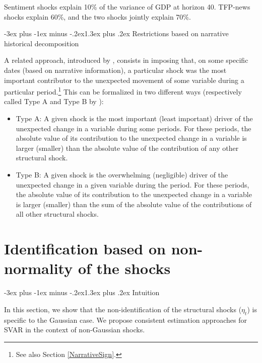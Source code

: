 \documentclass[
  11pt,
]{book}
\makeatletter
\providecommand{\tightlist}{%
  \setlength{\itemsep}{0pt}\setlength{\parskip}{0pt}}
\renewcommand\section{\@startsection{section}{1}{\z@}
  {-3ex plus -1ex minus -.2ex}{1.3ex plus .2ex}
  {\normalfont\Large\bfseries\color{TextbookInk}}}
\theoremstyle{definition}
\theoremstyle{definition}
\theoremstyle{definition}
\theoremstyle{definition}
\theoremstyle{remark}
\makeatother
\begin{document}
Sentiment shocks explain 10\% of the variance of GDP at horizon 40. TFP-news shocks explain 60\%, and the two shocks jointly explain 70\%.

\section{Restrictions based on narrative historical decomposition}\label{NarrativeHistDecomp}

A related approach, introduced by \citet{AntolinDiaz_RubioRamirez_2018}, consists in imposing that, on some specific dates (based on narrative information), a particular shock was the most important contributor to the unexpected movement of some variable during a particular period.\footnote{See also Section \ref{NarrativeSign}.} This can be formalized in two different ways (respectively called Type A and Type B by \citet{AntolinDiaz_RubioRamirez_2018}):

\begin{itemize}
\tightlist
\item
  Type A: A given shock is the most important (least important) driver of the unexpected change in a variable during some periods. For these periods, the absolute value of its contribution to the unexpected change in a variable is larger (smaller) than the absolute value of the contribution of any other structural shock.
\item
  Type B: A given shock is the overwhelming (negligible) driver of the unexpected change in a given variable during the period. For these periods, the absolute value of its contribution to the unexpected change in a variable is larger (smaller) than the sum of the absolute value of the contributions of all other structural shocks.
\end{itemize}

\chapter{Identification based on non-normality of the shocks}\label{NonGaussian}

\section{Intuition}\label{intuition}

In this section, we show that the non-identification of the structural shocks (\(\eta_t\)) is specific to the Gaussian case. We propose consistent estimation approaches for SVAR in the context of non-Gaussian shocks.
\end{document}
